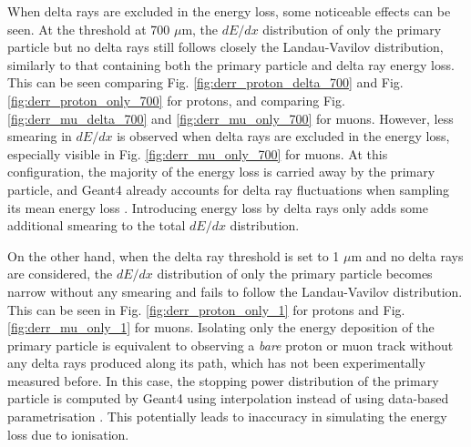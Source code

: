 When delta rays are excluded in the energy loss, some noticeable effects can be seen. 
At the threshold at 700 $\mu$m, the $dE/dx$ distribution of only the primary particle but no delta rays still follows closely the Landau-Vavilov distribution, similarly to that containing both the primary particle and delta ray energy loss.
This can be seen comparing Fig. \ref{fig:derr_proton_delta_700} and Fig. \ref{fig:derr_proton_only_700} for protons, and comparing Fig. \ref{fig:derr_mu_delta_700} and \ref{fig:derr_mu_only_700} for muons. 
However, less smearing in $dE/dx$ is observed when delta rays are excluded in the energy loss, especially visible in Fig. \ref{fig:derr_mu_only_700} for muons.
At this configuration, the majority of the energy loss is carried away by the primary particle, and Geant4 already accounts for delta ray fluctuations when sampling its mean energy loss \cite{geant4}.
Introducing energy loss by delta rays only adds some additional smearing to the total $dE/dx$ distribution.

On the other hand, when the delta ray threshold is set to 1 $\mu$m and no delta rays are considered, the $dE/dx$ distribution of only the primary particle becomes narrow without any smearing and fails to follow the Landau-Vavilov distribution.
This can be seen in Fig. \ref{fig:derr_proton_only_1} for protons and Fig. \ref{fig:derr_mu_only_1} for muons. 
Isolating only the energy deposition of the primary particle is equivalent to observing a \textit{bare} proton or muon track without any delta rays produced along its path, which has not been experimentally measured before.
In this case, the stopping power distribution of the primary particle is computed by Geant4 using interpolation instead of using data-based parametrisation \cite{geant4}.
This potentially leads to inaccuracy in simulating the energy loss due to ionisation.

